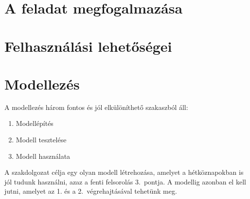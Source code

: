 \section{A feladat megfogalmazása}

\section{Felhasználási lehetőségei}

\section{Modellezés}

A modellezés három fontos és jól elkülöníthető szakaszból áll:

\begin{enumerate}
    \item Modellépítés
    \item Modell tesztelése
    \item Modell használata
\end{enumerate}

A szakdolgozat célja egy olyan modell létrehozása, amelyet a hétköznapokban is jól tudunk
használni, azaz a fenti felsorolás 3.\ pontja. A modellig azonban el kell jutni, amelyet az 1. és a
2.\ végrehajtásával tehetünk meg.